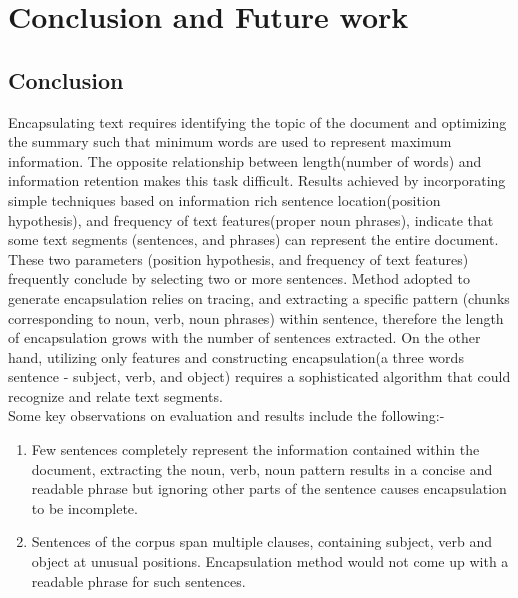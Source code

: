 \chapter{Conclusion and Future work}
\section{Conclusion}
Encapsulating text requires identifying the topic of the document and optimizing the summary such that minimum words are used to represent maximum information. The opposite
relationship between length(number of words) and information retention makes this task difficult. Results achieved by incorporating simple techniques based on information
rich sentence location(position hypothesis), and frequency of text features(proper noun phrases), indicate that some text segments (sentences, and phrases) can represent the entire document. 
These two parameters (position hypothesis, and frequency of text features) frequently conclude by selecting two or more sentences. Method adopted to generate 
encapsulation relies on tracing, and extracting a specific pattern (chunks corresponding to noun, verb, noun phrases) within sentence, therefore the length of encapsulation
grows with the number of sentences extracted. On the other hand, utilizing only features and constructing encapsulation(a three words sentence - subject, verb, and object) 
requires a sophisticated algorithm that could recognize and relate text segments. \\
Some key observations on evaluation and results include the following:-
\begin{enumerate}
 \item Few sentences completely represent the information contained within the document, extracting the noun, verb, noun pattern results in a concise and readable 
phrase but ignoring other parts of the sentence causes encapsulation to be incomplete.
 \item Sentences of the corpus span multiple clauses, containing subject, verb and object at unusual positions. Encapsulation method would not come up with a
readable phrase for such sentences.
\end{enumerate}


